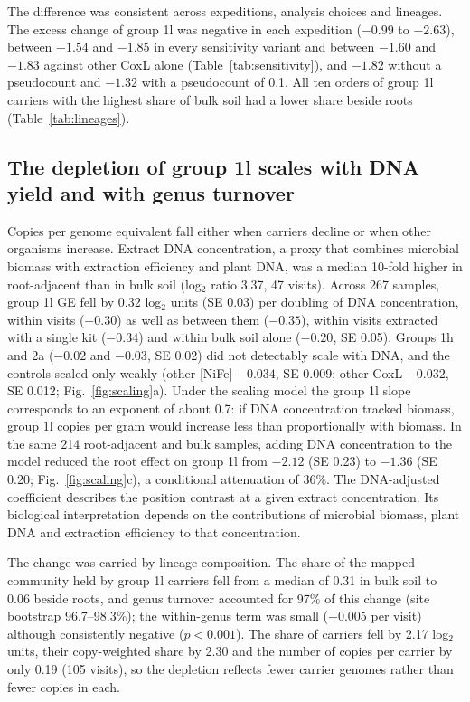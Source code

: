 \documentclass[11pt]{article}
\begin{document}
The difference was consistent across expeditions, analysis choices and lineages. The excess change of group
1l was negative in each expedition ($-0.99$ to $-2.63$), between $-1.54$ and $-1.85$ in every sensitivity
variant and between $-1.60$ and $-1.83$ against other CoxL alone (Table~\ref{tab:sensitivity}), and $-1.82$ without a pseudocount and $-1.32$ with a pseudocount of
0.1. All ten orders of group 1l carriers with the highest share of bulk soil had a lower share beside roots
(Table~\ref{tab:lineages}).

\subsection*{The depletion of group 1l scales with DNA yield and with genus turnover}
Copies per genome equivalent fall either when carriers decline or when other organisms increase. Extract
DNA concentration, a proxy that combines microbial biomass with extraction efficiency and plant DNA, was a
median 10-fold higher in root-adjacent than in bulk soil (log$_2$ ratio 3.37, 47 visits). Across 267
samples, group 1l GE fell by 0.32 log$_2$ units (SE 0.03) per doubling of DNA concentration, within visits
($-0.30$) as well as between them ($-0.35$), within visits extracted with a single kit ($-0.34$) and within
bulk soil alone ($-0.20$, SE 0.05). Groups 1h and 2a ($-0.02$ and $-0.03$, SE 0.02) did not detectably scale
with DNA, and the controls scaled only weakly (other [NiFe] $-0.034$, SE 0.009; other CoxL $-0.032$, SE 0.012;
Fig.~\ref{fig:scaling}a). Under the scaling model the group 1l slope corresponds to an exponent of about
0.7: if DNA concentration tracked biomass, group 1l copies per gram would increase less than proportionally
with biomass. In the same 214 root-adjacent and bulk samples, adding DNA concentration to the model reduced
the root effect on group 1l from $-2.12$ (SE 0.23) to $-1.36$ (SE 0.20; Fig.~\ref{fig:scaling}c), a
conditional attenuation of 36\%. The DNA-adjusted coefficient describes the position contrast
at a given extract concentration. Its biological interpretation depends on the contributions of
microbial biomass, plant DNA and extraction efficiency to that concentration.

The change was carried by lineage composition. The share of the mapped community held by group 1l
carriers fell from a median of 0.31 in bulk soil to 0.06 beside roots, and genus turnover accounted for
97\% of this change (site bootstrap 96.7--98.3\%); the within-genus term was small ($-0.005$ per visit)
although consistently negative ($p<0.001$). The share of carriers fell by 2.17 log$_2$ units, their copy-weighted share by 2.30 and
the number of copies per carrier by only 0.19 (105 visits), so the depletion reflects fewer carrier genomes rather than
fewer copies in each.
\end{document}
